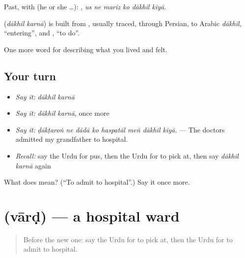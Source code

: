 Past, with  (he or she …):      , \emph{us ne marīz ko dākhil kiyā}.

\begin{cousinweb}
\textbf{ } (\emph{dākhil karnā}) is built from \textbf{}, usually traced, through Persian, to Arabic \emph{dākhil}, \textquotedblleft{}entering\textquotedblright{}, and \textbf{}, \textquotedblleft{}to do\textquotedblright{}.
\end{cousinweb}

\begin{grammarlens}[title={What you've built}]
One more word for describing what you lived and felt.
\end{grammarlens}

\subsection*{Your turn}
\begin{itemize}
\raggedright
  \item \emph{Say it:} \emph{dākhil karnā}
  \item \emph{Say it:} \emph{dākhil karnā}, once more
  \item \emph{Say it:} \emph{ḍākṭaroṅ ne dādā ko haspatāl meṅ dākhil kiyā.} — The doctors admitted my grandfather to hospital.
  \item \emph{Recall:} say the Urdu for pus, then the Urdu for to pick at, then say \emph{dākhil karnā} again
\end{itemize}

\begin{tcolorbox}[breakable,colback=teal!4,colframe=teal!35!black,title={Before you move on}]
What does   mean? (\textquotedblleft{}To admit to hospital\textquotedblright{}.) Say it once more.
\end{tcolorbox}
\section[\texorpdfstring{\ur{وارڈ} (vārḍ)}{وارڈ (vārḍ)}]{ (vārḍ) — a hospital ward}

\label{lesson:UR-C479-vard}



\begin{quote}
Before the new one: say the Urdu for to pick at, then the Urdu for to admit to hospital.
\end{quote}

